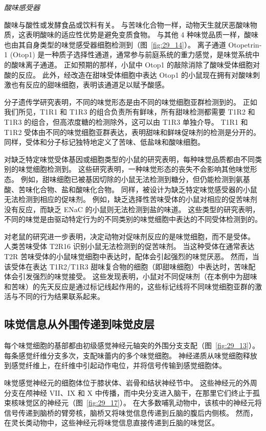 \textit{酸味感受器}

酸味与酸性或发酵食品或饮料有关。
与苦味化合物一样，动物天生就厌恶酸味物质，这表明酸味的适应性优势是避免变质食物。
与其他 4 种味觉品质一样，酸味也由其自身类型的味觉感受器细胞检测到（图~\ref{fig:29_14}）。
离子通道 Otopetrin-1 (Otop1) 是一种质子选择性通道，通常参与前庭系统的重力感觉，是味觉系统中的酸味离子通道。
正如预期的那样，小鼠中 Otop1 的敲除消除了酸味受体细胞对酸的反应。
此外，经改造在甜味受体细胞中表达 Otop1 的小鼠现在拥有对酸味刺激也有反应的甜味细胞，表明该通道足以赋予酸感。


分子遗传学研究表明，不同的味觉形态是由不同的味觉细胞亚群检测到的。
正如我们所见，T1R1 和 T1R3 的组合负责所有鲜味，所有甜味检测都需要 T1R2 和 T1R3 的组合，但高浓度糖的检测除外，这可以由 T1R3 单独介导。
T1R1 和 T1R2 受体由不同的味觉细胞亚群表达，表明甜味和鲜味促味剂的检测是分开的。
同样，受体和分子标记独特地定义了苦味、低盐味和酸味细胞。


对缺乏特定味觉受体基因或细胞类型的小鼠的研究表明，每种味觉品质都由不同类别的味觉细胞检测到。
这些研究表明，一种味觉形态的丧失不会影响其他味觉形态。
例如，甜味细胞已被基因切除的小鼠无法检测到糖分，但仍能检测到氨基酸、苦味化合物、盐和酸味化合物。
同样，被设计为缺乏特定味觉感受器的小鼠无法检测到相应的促味剂。
例如，缺乏选择性苦味受体的小鼠对相应的促苦味剂没有反应，而缺乏 ENaC 的小鼠则无法检测到盐的味道。
这些类型的研究表明，不同的味觉是由驱动特定行为的不同类别的味觉细胞中表达的不同受体检测到的。


对老鼠的研究进一步表明，决定动物对促味剂反应的是味觉细胞，而不是受体。
人类苦味受体 T2R16 识别小鼠无法检测到的促苦味剂。
当这种受体在通常表达 T2R 苦味受体的小鼠味觉细胞中表达时，配体会引起强烈的味觉厌恶。
然而，当该受体在表达 T1R2/T1R3 甜味复合物的细胞（即甜味细胞）中表达时，苦味配体会引发强烈的味觉接受。
这些发现表明，小鼠对不同促味剂（在本例中为甜味和苦味）的先天反应是通过标记线起作用的，这些标记线将不同味觉细胞亚群的激活与不同的行为结果联系起来。



\subsection{味觉信息从外围传递到味觉皮层}

每个味觉细胞的基部都由初级感觉神经元轴突的外围分支支配（图~\ref{fig:29_13}）。
每条感觉纤维分支多次，支配味蕾内的多个味觉细胞。
神经递质从味觉细胞释放到感觉纤维上，在纤维中引起动作电位，并将信号传输到感觉细胞体。


味觉感觉神经元的细胞体位于膝状体、岩骨和结状神经节中。
这些神经元的外周分支在颅神经 VII、IX 和 X 中传播，而中央分支进入脑干，在那里它们终止于孤束核味觉区的神经元（图~\ref{fig:29_17}）。
在大多数哺乳动物中，该核中的神经元将信号传递到脑桥的臂旁核，脑桥又将味觉信息传递到丘脑的腹后内侧核。 
然而，在灵长类动物中，这些神经元将味觉信息直接传递到丘脑的味觉区。


